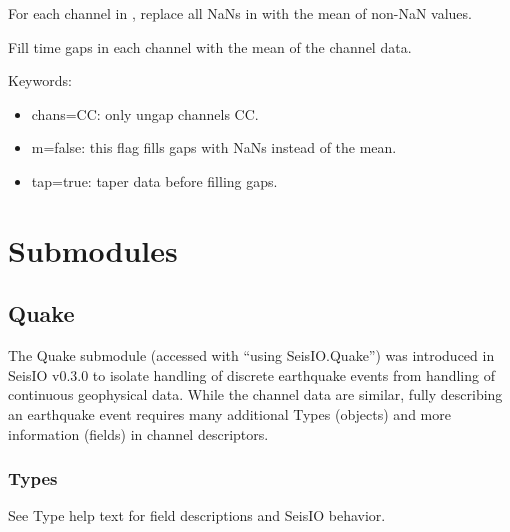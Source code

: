 \documentclass[letterpaper,11pt,english]{sphinxmanual}
\begin{document}
For each channel  in , replace all NaNs in  with the mean
of non-NaN values.


\begin{fulllineitems}
\end{fulllineitems}



\begin{fulllineitems}
\end{fulllineitems}


Fill time gaps in each channel with the mean of the channel data.

Keywords:
\begin{itemize}
\item {} 
chans=CC: only ungap channels CC.

\item {} 
m=false: this flag fills gaps with NaNs instead of the mean.

\item {} 
tap=true: taper data before filling gaps.

\end{itemize}


\chapter{Submodules}
\label{\detokenize{index:submodules}}

\section{Quake}
\label{\detokenize{src/Submodules/quake:quake}}\label{\detokenize{src/Submodules/quake::doc}}
The Quake submodule (accessed with “using SeisIO.Quake”) was introduced in
SeisIO v0.3.0 to isolate handling of discrete earthquake events from handling
of continuous geophysical data. While the channel data are similar, fully
describing an earthquake event requires many additional Types (objects) and
more information (fields) in channel descriptors.


\subsection{Types}
\label{\detokenize{src/Submodules/quake:types}}
See Type help text for field descriptions and SeisIO behavior.
\end{document}
